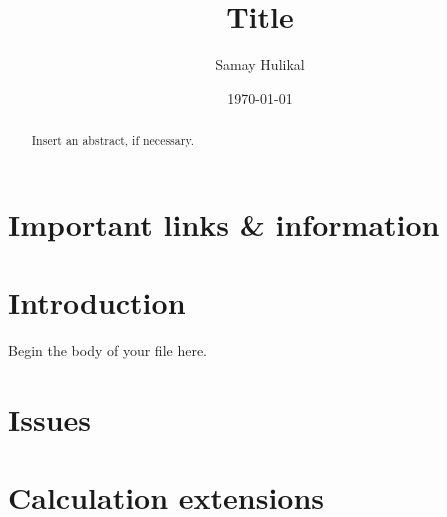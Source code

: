 \documentclass[%
superscriptaddress, %
onecolumn,
amsmath,
amssymb,
amsfonts,
nofootinbib
]{revtex4-2}
\begin{document}
\title{Title}
\author{Samay Hulikal}
\begin{abstract}
Insert an abstract, if necessary. 
\end{abstract}
\date{\today}
\maketitle
\tableofcontents
\section{Important links \& information}
\section{Introduction}
Begin the body of your file here.
\section{Issues}
\section{Calculation extensions}


\end{document}
